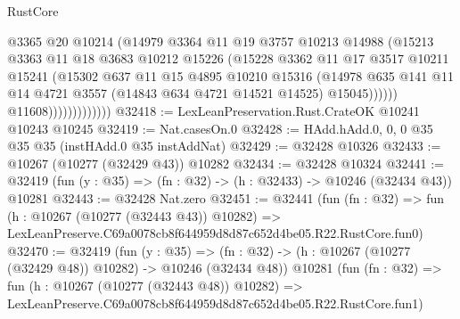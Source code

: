 \begin{lexlean}{RustCore}
\begin{coremodule}
                                @3365
                                @20
                                @10214
                                (@14979
                                  @3364
                                  @11
                                  @19
                                  @3757
                                  @10213
                                  @14988
                                  (@15213
                                    @3363
                                    @11
                                    @18
                                    @3683
                                    @10212
                                    @15226
                                    (@15228
                                      @3362
                                      @11
                                      @17
                                      @3517
                                      @10211
                                      @15241
                                      (@15302
                                        @637
                                        @11
                                        @15
                                        @4895
                                        @10210
                                        @15316
                                        (@14978
                                          @635
                                          @141
                                          @11
                                          @14
                                          @4721
                                          @3557
                                          (@14843 @634 @4721 @14521 @14525)
                                          @15045))))))
                              @11608)))))))))))))
@32418 := LexLeanPreservation.Rust.CrateOK @10241 @10243 @10245
@32419 := Nat.casesOn.{0}
@32428 := HAdd.hAdd.{0, 0, 0} @35 @35 @35 (instHAdd.{0} @35 instAddNat)
@32429 := @32428 @10326
@32433 := @10267 (@10277 (@32429 @43)) @10282
@32434 := @32428 @10324
@32441 := @32419 (fun (y : @35) => (fn : @32) -> (h : @32433) -> @10246 (@32434 @43)) @10281
@32443 := @32428 Nat.zero
@32451 := @32441
    (fun (fn : @32) =>
    fun (h : @10267 (@10277 (@32443 @43)) @10282) =>
    LexLeanPreserve.C69a0078cb8f644959d8d87c652d4be05.R22.RustCore.fun0)
@32470 := @32419
    (fun (y : @35) =>
    (fn : @32) -> (h : @10267 (@10277 (@32429 @48)) @10282) -> @10246 (@32434 @48))
    @10281
    (fun (fn : @32) =>
    fun (h : @10267 (@10277 (@32443 @48)) @10282) =>
    LexLeanPreserve.C69a0078cb8f644959d8d87c652d4be05.R22.RustCore.fun1)

\end{coremodule}
\end{lexlean}
